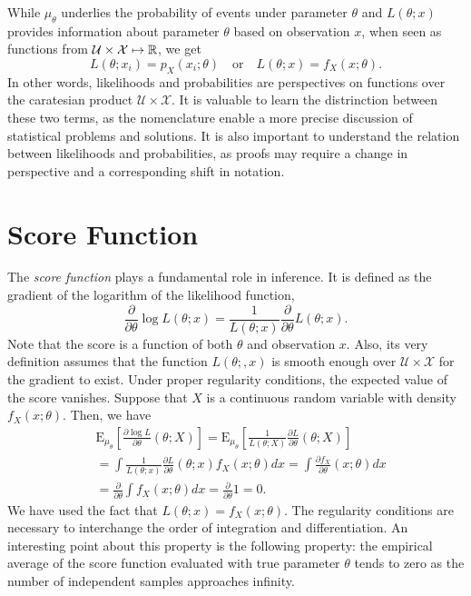 While $\mu_{\theta}$ underlies the probability of events under parameter $\theta$ and $L (\theta; x)$ provides information about parameter $\theta$ based on observation $x$, when seen as functions from $\mathcal{U} \times \mathcal{X} \mapsto \mathbb{R}$, we get
\begin{equation*}
L(\theta; x_i) = p_X (x_i; \theta) \quad \text{or} \quad L(\theta; x) = f_X (x; \theta) .
\end{equation*}
In other words, likelihoods and probabilities are perspectives on functions over the caratesian product $\mathcal{U} \times \mathcal{X}$.
It is valuable to learn the distrinction between these two terms, as the nomenclature enable a more precise discussion of statistical problems and solutions.
It is also important to understand the relation between likelihoods and probabilities, as proofs may require a change in perspective and a corresponding shift in notation.


\section{Score Function}

The \emph{score function} plays a fundamental role in inference.
It is defined as the gradient of the logarithm of the likelihood function,
\begin{equation*}
\frac{\partial}{\partial \theta} \log L(\theta ; x)
= \frac{1}{L (\theta; x)} \frac{\partial}{\partial \theta} L (\theta; x) .
\end{equation*}
Note that the score is a function of both $\theta$ and observation $x$.
Also, its very definition assumes that the function $L(\theta;, x)$ is smooth enough over $\mathcal{U} \times \mathcal{X}$ for the gradient to exist.
Under proper regularity conditions, the expected value of the score vanishes.
Suppose that $X$ is a continuous random variable with density $f_{X} (x; \theta)$.
Then, we have
\begin{equation*}
\begin{split}
&\mathrm{E}_{\mu_{\theta}} \left[ \frac{\partial \log L}{\partial \theta} (\theta ; X) \right]
= \mathrm{E}_{\mu_{\theta}} \left[ \frac{1}{L (\theta; X)} \frac{\partial L}{\partial \theta} (\theta; X) \right] \\
&= \int \frac{1}{L (\theta; x)} \frac{\partial L}{\partial \theta} (\theta; x) f_{X} (x; \theta) dx
= \int \frac{\partial f_X}{\partial \theta} (x; \theta) dx \\
&= \frac{\partial}{\partial \theta} \int f_X (x; \theta) dx
= \frac{\partial}{\partial \theta} 1 = 0 .
\end{split}
\end{equation*}
We have used the fact that $L (\theta; x) = f_X (x; \theta)$.
The regularity conditions are necessary to interchange the order of integration and differentiation.
An interesting point about this property is the following property: the empirical average of the score function evaluated with true parameter $\theta$ tends to zero as the number of independent samples approaches infinity.


